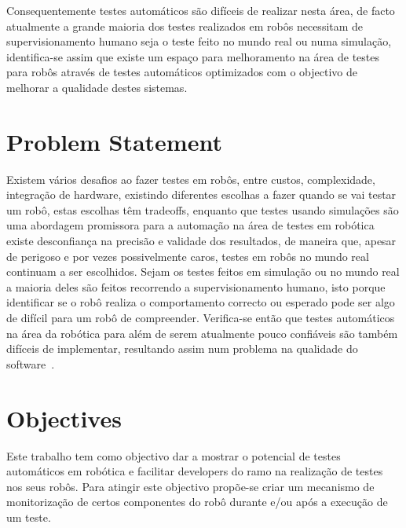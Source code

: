 
Consequentemente testes 
automáticos são difíceis de realizar nesta área, de facto atualmente a grande maioria dos testes 
realizados em robôs necessitam de supervisionamento humano seja o teste feito no mundo real ou numa 
simulação, identifica-se assim que existe um espaço para melhoramento na área de testes para robôs 
através de testes automáticos optimizados com o objectivo de melhorar a qualidade destes sistemas.

\section{Problem Statement}
\label{sec:problem}


Existem vários desafios ao fazer testes em robôs, entre custos, complexidade, integração de hardware, 
existindo diferentes escolhas a fazer quando se vai testar um robô, estas escolhas têm tradeoffs, 
enquanto que testes usando simulações são uma abordagem promissora para a automação na área de testes 
em robótica existe desconfiança na precisão e validade dos resultados, de maneira que, apesar de 
perigoso e por vezes possivelmente caros, testes em robôs no mundo real continuam a ser escolhidos. 
Sejam os testes feitos em simulação ou no mundo real a maioria deles são feitos recorrendo a 
supervisionamento humano, isto porque identificar se o robô realiza o comportamento correcto ou 
esperado pode ser algo de difícil para um robô de compreender. Verifica-se então que testes automáticos 
na área da robótica para além de serem atualmente pouco confiáveis são também difíceis de implementar, 
resultando assim num problema na qualidade do software~\cite{TestRob}.

\section{Objectives}
\label{sec:objectives}

Este trabalho tem como objectivo dar a mostrar o potencial de testes automáticos em robótica e facilitar 
developers do ramo na realização de testes nos seus robôs. Para atingir este objectivo propõe-se criar 
um mecanismo de monitorização de certos componentes do robô durante e/ou após a execução de um teste. 


